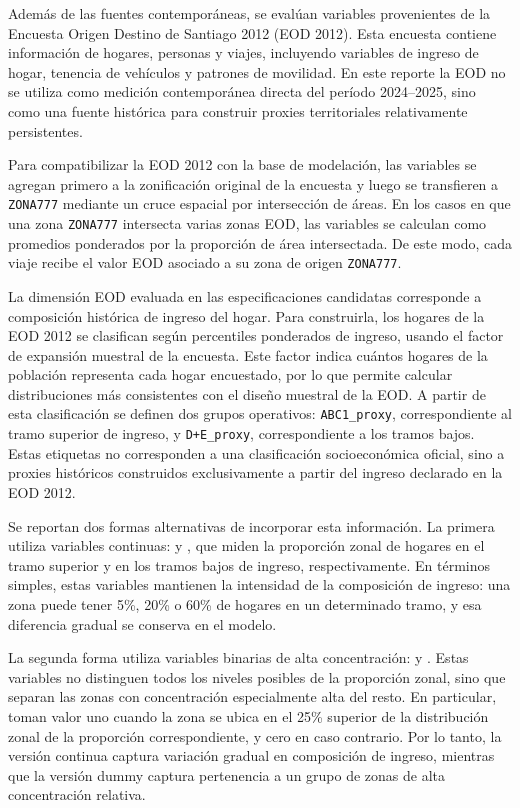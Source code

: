 Además de las fuentes contemporáneas, se evalúan variables provenientes de la Encuesta Origen Destino de Santiago 2012 (EOD 2012). Esta encuesta contiene información de hogares, personas y viajes, incluyendo variables de ingreso de hogar, tenencia de vehículos y patrones de movilidad. En este reporte la EOD no se utiliza como medición contemporánea directa del período 2024--2025, sino como una fuente histórica para construir proxies territoriales relativamente persistentes.

Para compatibilizar la EOD 2012 con la base de modelación, las variables se agregan primero a la zonificación original de la encuesta y luego se transfieren a \texttt{ZONA777} mediante un cruce espacial por intersección de áreas. En los casos en que una zona \texttt{ZONA777} intersecta varias zonas EOD, las variables se calculan como promedios ponderados por la proporción de área intersectada. De este modo, cada viaje recibe el valor EOD asociado a su zona de origen \texttt{ZONA777}.

La dimensión EOD evaluada en las especificaciones candidatas corresponde a composición histórica de ingreso del hogar. Para construirla, los hogares de la EOD 2012 se clasifican según percentiles ponderados de ingreso, usando el factor de expansión muestral de la encuesta. Este factor indica cuántos hogares de la población representa cada hogar encuestado, por lo que permite calcular distribuciones más consistentes con el diseño muestral de la EOD. A partir de esta clasificación se definen dos grupos operativos: \texttt{ABC1\_proxy}, correspondiente al tramo superior de ingreso, y \texttt{D+E\_proxy}, correspondiente a los tramos bajos. Estas etiquetas no corresponden a una clasificación socioeconómica oficial, sino a proxies históricos construidos exclusivamente a partir del ingreso declarado en la EOD 2012.

Se reportan dos formas alternativas de incorporar esta información. La primera utiliza variables continuas:  y , que miden la proporción zonal de hogares en el tramo superior y en los tramos bajos de ingreso, respectivamente. En términos simples, estas variables mantienen la intensidad de la composición de ingreso: una zona puede tener 5\%, 20\% o 60\% de hogares en un determinado tramo, y esa diferencia gradual se conserva en el modelo.

La segunda forma utiliza variables binarias de alta concentración:  y . Estas variables no distinguen todos los niveles posibles de la proporción zonal, sino que separan las zonas con concentración especialmente alta del resto. En particular, toman valor uno cuando la zona se ubica en el 25\% superior de la distribución zonal de la proporción correspondiente, y cero en caso contrario. Por lo tanto, la versión continua captura variación gradual en composición de ingreso, mientras que la versión dummy captura pertenencia a un grupo de zonas de alta concentración relativa.

